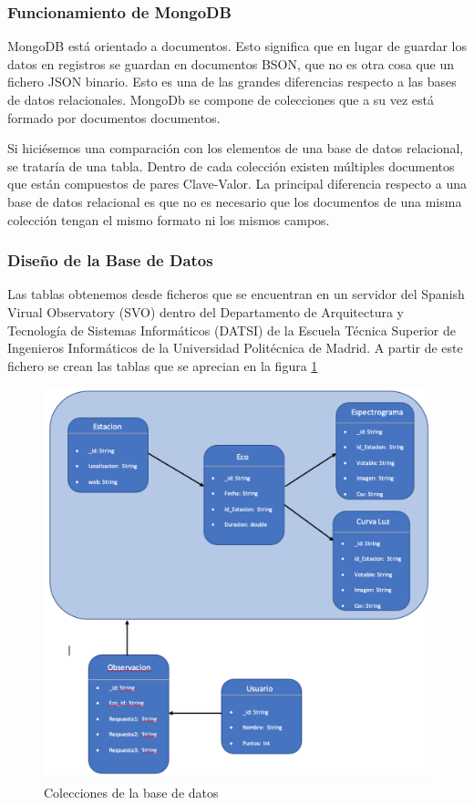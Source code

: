\subsubsection{Funcionamiento de MongoDB}
MongoDB está orientado a documentos. Esto significa que en lugar de guardar los datos en registros se guardan en documentos BSON, que no es otra cosa que un fichero JSON binario.
Esto es una de las grandes diferencias respecto a las bases de datos relacionales. 
MongoDb se compone de colecciones que a su vez está formado por documentos documentos. 

Si hiciésemos una comparación con los elementos de una base de datos relacional, se trataría de una tabla. Dentro de cada colección existen múltiples documentos que están compuestos de pares Clave-Valor. 
La principal diferencia respecto a una base de datos relacional es que no es necesario que los documentos de una misma colección tengan el mismo formato ni los mismos campos.
\newpage
\subsubsection{Diseño de la Base de Datos}

Las tablas obtenemos desde ficheros que se encuentran en un servidor del Spanish Virual Observatory (SVO) dentro del Departamento de Arquitectura y Tecnología de Sistemas Informáticos (DATSI) de la Escuela Técnica Superior de Ingenieros Informáticos de la Universidad Politécnica de Madrid. A partir de este fichero se crean las tablas que se aprecian en la figura \ref{fig:tablas_base_datos}

\begin{figure}[h]
    \centering
    \includegraphics[scale=0.6]{include/figuras/Tablas.png}
    \caption{Colecciones de la base de datos}
    \label{fig:tablas_base_datos}
\end{figure}

